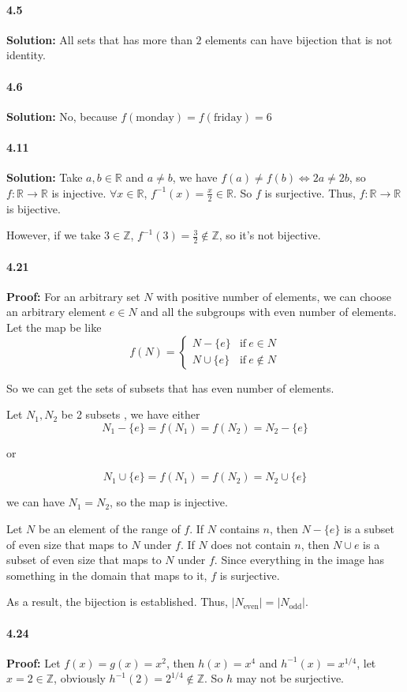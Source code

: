 \documentclass[11pt]{article}
\begin{document}
	\paragraph{4.5}\textbf{Solution:} All sets that has more than $2$ elements can have bijection that is not identity.
	\paragraph{4.6}\textbf{Solution:} No, because $f(\mathrm{monday}) = f(\mathrm{friday}) = 6$
	\paragraph{4.11}\textbf{Solution:}
		Take $a, b \in \mathbb{R}$ and $a \neq b$, we have $f(a) \neq f(b) \Leftrightarrow 2a \neq 2b$, so $f : \mathbb{R} \rightarrow \mathbb{R}$ is injective. $\forall x \in \mathbb{R}$, $f^{-1}(x) = \frac{x}{2} \in \mathbb R$. So $f$ is surjective. Thus, $f: \mathbb{R} \rightarrow \mathbb{R}$ is bijective.
		
		However, if we take $3 \in \mathbb{Z}$, $f^{-1}(3) = \frac{3}{2} \notin \mathbb{Z}$, so it's not bijective.
	\paragraph{4.21}\textbf{Proof:}
	 	For an arbitrary set $N$ with positive number of elements, we can choose an arbitrary element $e \in N$ and all the subgroups with even number of elements. Let the map be like 
	 	\[f(N) = \left\{\begin{array}{ll} N - \{e\} & \mathrm{if}\ e \in N\\ N \cup \{e\} & \mathrm{if}\ e \notin N\end{array}\right.\]
	 	
	 	So we can get the sets of subsets that has even number of elements.
	 	
	 	Let $N_1, N_2$ be 2 subsets , we have either
	 		\[N_1 - \{e\} = f(N_1) = f(N_2) = N_2 - \{e\}\]
	 		
	 		or
	 		
	 		\[N_1 \cup \{e\} = f(N_1) = f(N_2) = N_2 \cup \{e\}\]
	 		
	 		we can have $N_1 = N_2$, so the map is injective.
	 		
	 		Let $N$ be an element of the range of $f$. If $N$ contains $n$, then $N−\{e\}$ is a subset of even size that maps to $N$ under $f$. If $N$ does not contain $n$, then $N \cup {e}$ is a subset of even size that maps to $N$ under $f$. Since everything in the image has something in the domain that maps to it, $f$ is surjective.
	 		
	 		As a result, the bijection is established. Thus, $|N_{\mathrm{even}}| =|N_{\mathrm{odd}}|$.
	\paragraph{4.24}\textbf{Proof:}
		 Let $f(x) = g(x) = x^2$, then $h(x) = x^4$ and $h^{-1}(x) = x^{1/4}$, let $x = 2 \in \mathbb{Z}$, obviously $h^{-1}(2) = 2^{1/4} \notin \mathbb{Z}$. So $h$ may not be surjective. 
\end{document}
